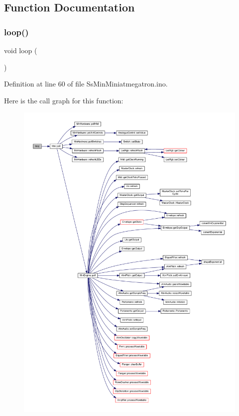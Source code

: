 \subsection{Function Documentation}
\mbox{\label{_ss_min_miniatmegatron_8ino_afe461d27b9c48d5921c00d521181f12f}} 
\subsubsection{\texorpdfstring{loop()}{loop()}}
{\footnotesize\ttfamily void loop (\begin{DoxyParamCaption}{ }\end{DoxyParamCaption})}



Definition at line 60 of file Ss\+Min\+Miniatmegatron.\+ino.

Here is the call graph for this function\+:
\nopagebreak
\begin{figure}[H]
\begin{center}
\leavevmode
\includegraphics[width=350pt]{d1/d54/_ss_min_miniatmegatron_8ino_afe461d27b9c48d5921c00d521181f12f_cgraph}
\end{center}
\end{figure}
\mbox{\label{_ss_min_miniatmegatron_8ino_a4fc01d736fe50cf5b977f755b675f11d}} 
